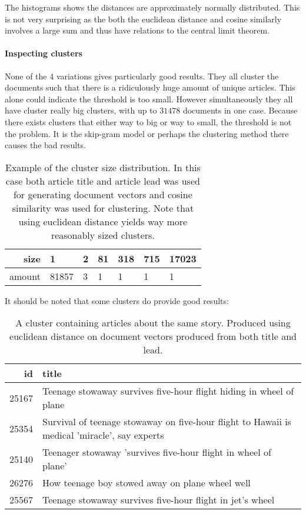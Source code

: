 The histograms shows the distances are approximately normally distributed. This is not very surprising as the both the euclidean distance and cosine similarly involves a large sum and thus have relations to the central limit theorem.

\paragraph{Inspecting clusters}  None of the 4 variations gives particularly good results. They all cluster the documents such that there is a ridiculously huge amount of unique articles. This alone could indicate the threshold is too small. However simultaneously they all have cluster really big clusters, with up to $31478$ documents in one case. Because there exists clusters that either way to big or way to small, the threshold is not the problem. It is the skip-gram model or perhaps the clustering method there causes the bad results.

\begin{table}[H]
\centering
\begin{tabular}{r|l l l l l l }
size & 1 & 2 & 81 & 318 & 715 & 17023 \\ \hline
amount & 81857 & 3 & 1 & 1 & 1 & 1
\end{tabular}
\caption{Example of the cluster size distribution. In this case both article title and article lead was used for generating document vectors and cosine similarity was used for clustering. Note that using euclidean distance yields way more reasonably sized clusters.}
\end{table}

It should be noted that some clusters do provide good results:

\begin{table}[H]
\centering
\begin{tabular}{r|p{10cm}}
id & title \\ \hline
 25167 & Teenage stowaway survives five-hour flight hiding in wheel of plane \\
 25354 & Survival of teenage stowaway on five-hour flight to Hawaii is medical 'miracle', say experts \\
 25140 & Teenager stowaway 'survives five-hour flight in wheel of plane' \\
 26276 & How teenage boy stowed away on plane wheel well \\
 25567 & Teenage stowaway survives five-hour flight in jet's wheel
\end{tabular}
\caption{A cluster containing articles about the same story. Produced using euclidean distance on document vectors produced from both title and lead.}
\end{table}
 
